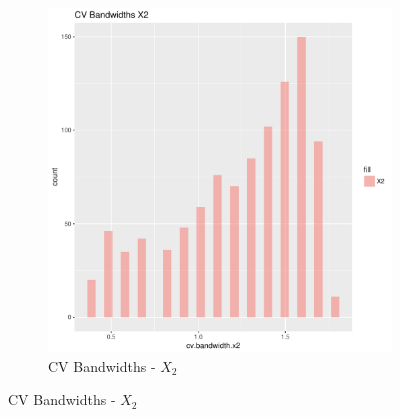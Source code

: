 \begin{figure}[htbp]
\begin{subfigure}[b]{0.45\textwidth}
    \includegraphics[width=\textwidth]{output/bandwidths-x2}
    \caption{CV Bandwidths - \(X_2\)}
    \end{subfigure}


\end{figure}
